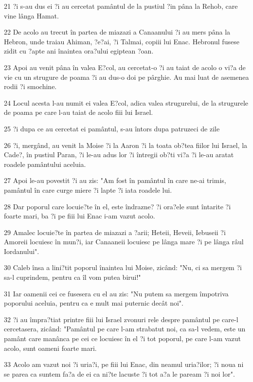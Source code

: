 \par 21 ?i s-au dus ei ?i au cercetat pamântul de la pustiul ?in pâna la Rehob, care vine lânga Hamat.
\par 22 De acolo au trecut în partea de miazazi a Canaanului ?i au mers pâna la Hebron, unde traiau Ahiman, ?e?ai, ?i Talmai, copiii lui Enac. Hebronul fusese zidit cu ?apte ani înaintea ora?ului egiptean ?oan.
\par 23 Apoi au venit pâna în valea E?col, au cercetat-o ?i au taiat de acolo o vi?a de vie cu un strugure de poama ?i au dus-o doi pe pârghie. Au mai luat de asemenea rodii ?i smochine.
\par 24 Locul acesta l-au numit ei valea E?col, adica valea strugurelui, de la strugurele de poama pe care l-au taiat de acolo fiii lui Israel.
\par 25 ?i dupa ce au cercetat ei pamântul, s-au întors dupa patruzeci de zile
\par 26 ?i, mergând, au venit la Moise ?i la Aaron ?i la toata ob?tea fiilor lui Israel, la Cade?, în pustiul Paran, ?i le-au adus lor ?i întregii ob?ti vi?a ?i le-au aratat roadele pamântului aceluia.
\par 27 Apoi le-au povestit ?i au zis: "Am fost în pamântul în care ne-ai trimis, pamântul în care curge miere ?i lapte ?i iata roadele lui.
\par 28 Dar poporul care locuie?te în el, este îndrazne? ?i ora?ele sunt întarite ?i foarte mari, ba ?i pe fiii lui Enac i-am vazut acolo.
\par 29 Amalec locuie?te în partea de miazazi a ?arii; Heteii, Heveii, Iebuseii ?i Amoreii locuiesc în mun?i, iar Canaaneii locuiesc pe lânga mare ?i pe lânga râul Iordanului".
\par 30 Caleb însa a lini?tit poporul înaintea lui Moise, zicând: "Nu, ci sa mergem ?i sa-l cuprindem, pentru ca îl vom putea birui!"
\par 31 Iar oamenii cei ce fusesera cu el au zis: "Nu putem sa mergem împotriva poporului aceluia, pentru ca e mult mai puternic decât noi".
\par 32 ?i au împra?tiat printre fiii lui Israel zvonuri rele despre pamântul pe care-l cercetasera, zicând: "Pamântul pe care l-am strabatut noi, ca sa-l vedem, este un pamânt care manânca pe cei ce locuiesc în el ?i tot poporul, pe care l-am vazut acolo, sunt oameni foarte mari.
\par 33 Acolo am vazut noi ?i uria?i, pe fiii lui Enac, din neamul uria?ilor; ?i noua ni se parea ca suntem fa?a de ei ca ni?te lacuste ?i tot a?a le paream ?i noi lor".

